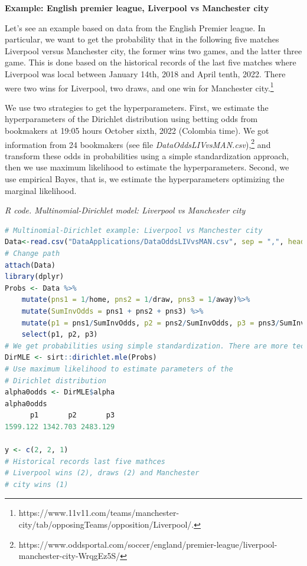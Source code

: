\begin{enumerate}
\textbf{Example: English premier league, Liverpool vs Manchester city}

Let's see an example based on data from the English Premier league. In particular, we want to get the probability that in the following five matches Liverpool versus Manchester city, the former wins two games, and the latter three game. This is done based on the historical records of the last five matches where Liverpool was local between January 14th, 2018 and April tenth, 2022. There were two wins for Liverpool, two draws, and one win for Manchester city.\footnote{https://www.11v11.com/teams/manchester-city/tab/opposingTeams/opposition/Liverpool/.}

We use two strategies to get the hyperparameters. First, we estimate the hyperparameters of the Dirichlet distribution using betting odds from bookmakers at 19:05 hours October sixth, 2022 (Colombia time). We got information from 24 bookmakers (see file \textit{DataOddsLIVvsMAN.csv}),\footnote{https://www.oddsportal.com/soccer/england/premier-league/liverpool-manchester-city-WrqgEz5S/} and transform these odds in probabilities using a simple standardization approach, then we use maximum likelihood to estimate the hyperparameters. Second, we use empirical Bayes, that is, we estimate the hyperparameters optimizing the marginal likelihood.   


\begin{tcolorbox}[enhanced,width=4.67in,center upper,
	fontupper=\large\bfseries,drop shadow southwest,sharp corners]
	\textit{R code. Multinomial-Dirichlet model: Liverpool vs Manchester city}
\begin{VF}
\begin{lstlisting}[language=R]
# Multinomial-Dirichlet example: Liverpool vs Manchester city
Data<-read.csv("DataApplications/DataOddsLIVvsMAN.csv", sep = ",", header = TRUE)
# Change path
attach(Data)
library(dplyr)
Probs <- Data %>%
	mutate(pns1 = 1/home, pns2 = 1/draw, pns3 = 1/away)%>% 
	mutate(SumInvOdds = pns1 + pns2 + pns3) %>% 
	mutate(p1 = pns1/SumInvOdds, p2 = pns2/SumInvOdds, p3 = pns3/SumInvOdds) %>% 
	select(p1, p2, p3)
# We get probabilities using simple standardization. There are more technical approaches to do this. See for instance Shin (1993) and Strumbelj (2014). 
DirMLE <- sirt::dirichlet.mle(Probs)
# Use maximum likelihood to estimate parameters of the
# Dirichlet distribution
alpha0odds <- DirMLE$alpha
alpha0odds
      p1       p2       p3 
1599.122 1342.703 2483.129 

y <- c(2, 2, 1) 
# Historical records last five mathces
# Liverpool wins (2), draws (2) and Manchester
# city wins (1)


\end{lstlisting}
\end{VF}
\end{tcolorbox}
\end{enumerate}
